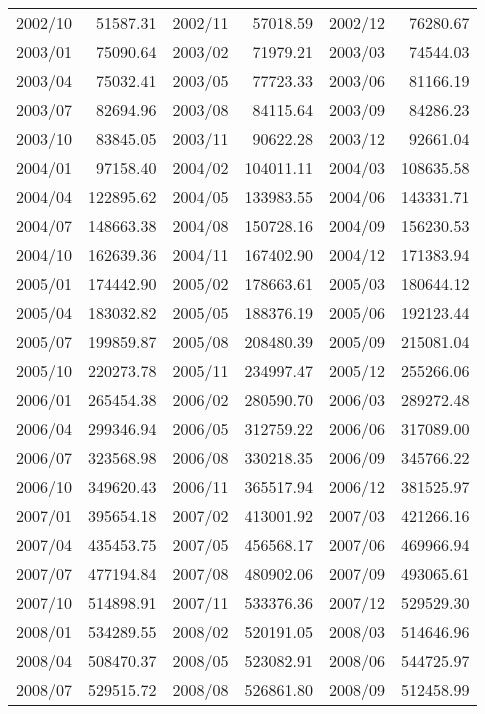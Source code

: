 \begin{center}
\begin{longtable}{rr|rr|rr}
    2002/10 & 51587.31 & 2002/11 & 57018.59 & 2002/12 & 76280.67 \\
    2003/01 & 75090.64 & 2003/02 & 71979.21 & 2003/03 & 74544.03 \\
    2003/04 & 75032.41 & 2003/05 & 77723.33 & 2003/06 & 81166.19 \\
    2003/07 & 82694.96 & 2003/08 & 84115.64 & 2003/09 & 84286.23 \\
    2003/10 & 83845.05 & 2003/11 & 90622.28 & 2003/12 & 92661.04 \\
    2004/01 & 97158.40 & 2004/02 & 104011.11 & 2004/03 & 108635.58 \\
    2004/04 & 122895.62 & 2004/05 & 133983.55 & 2004/06 & 143331.71 \\
    2004/07 & 148663.38 & 2004/08 & 150728.16 & 2004/09 & 156230.53 \\
    2004/10 & 162639.36 & 2004/11 & 167402.90 & 2004/12 & 171383.94 \\
    2005/01 & 174442.90 & 2005/02 & 178663.61 & 2005/03 & 180644.12 \\
    2005/04 & 183032.82 & 2005/05 & 188376.19 & 2005/06 & 192123.44 \\
    2005/07 & 199859.87 & 2005/08 & 208480.39 & 2005/09 & 215081.04 \\
    2005/10 & 220273.78 & 2005/11 & 234997.47 & 2005/12 & 255266.06 \\
    2006/01 & 265454.38 & 2006/02 & 280590.70 & 2006/03 & 289272.48 \\
    2006/04 & 299346.94 & 2006/05 & 312759.22 & 2006/06 & 317089.00 \\
    2006/07 & 323568.98 & 2006/08 & 330218.35 & 2006/09 & 345766.22 \\
    2006/10 & 349620.43 & 2006/11 & 365517.94 & 2006/12 & 381525.97 \\
    2007/01 & 395654.18 & 2007/02 & 413001.92 & 2007/03 & 421266.16 \\
    2007/04 & 435453.75 & 2007/05 & 456568.17 & 2007/06 & 469966.94 \\
    2007/07 & 477194.84 & 2007/08 & 480902.06 & 2007/09 & 493065.61 \\
    2007/10 & 514898.91 & 2007/11 & 533376.36 & 2007/12 & 529529.30 \\
    2008/01 & 534289.55 & 2008/02 & 520191.05 & 2008/03 & 514646.96 \\
    2008/04 & 508470.37 & 2008/05 & 523082.91 & 2008/06 & 544725.97 \\
    2008/07 & 529515.72 & 2008/08 & 526861.80 & 2008/09 & 512458.99 \\

\end{longtable}
\end{center}
